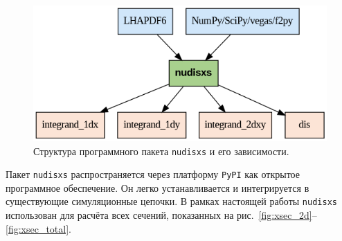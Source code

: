 \begin{figure}[!h]
\centering
\includegraphics[width=\linewidth]{images/nudisxs_diagram.png}
\caption{Структура программного пакета \texttt{nudisxs} и его зависимости.}
\label{fig:nudisxs1}
\end{figure}

Пакет \texttt{nudisxs} распространяется через платформу \texttt{PyPI} как открытое программное обеспечение. 
Он легко устанавливается и интегрируется в существующие симуляционные цепочки. 
В рамках настоящей работы \texttt{nudisxs} использован для расчёта всех сечений, показанных на рис.~\ref{fig:xsec_2d}–\ref{fig:xsec_total}.
